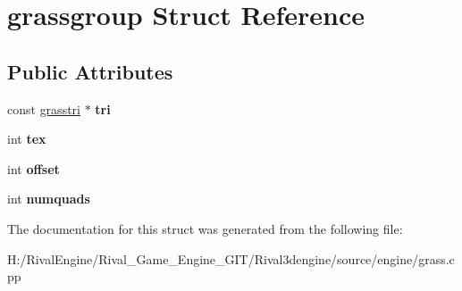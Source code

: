\hypertarget{structgrassgroup}{}\section{grassgroup Struct Reference}
\label{structgrassgroup}
\subsection*{Public Attributes}
\begin{DoxyCompactItemize}
\item 
\mbox{\label{structgrassgroup_aec4811ba558aa691e98650203073af60}} 
const \hyperlink{structgrasstri}{grasstri} $\ast$ {\bfseries tri}
\item 
\mbox{\label{structgrassgroup_ab59941092fe226f388662f0e7a7e637d}} 
int {\bfseries tex}
\item 
\mbox{\label{structgrassgroup_ac3a722e78fc93507b060f00d8eaf5fb4}} 
int {\bfseries offset}
\item 
\mbox{\label{structgrassgroup_a46a1643c6fe891dc6756b374d2fc9b6b}} 
int {\bfseries numquads}
\end{DoxyCompactItemize}


The documentation for this struct was generated from the following file\+:\begin{DoxyCompactItemize}
\item 
H\+:/\+Rival\+Engine/\+Rival\+\_\+\+Game\+\_\+\+Engine\+\_\+\+G\+I\+T/\+Rival3dengine/source/engine/grass.\+cpp\end{DoxyCompactItemize}

